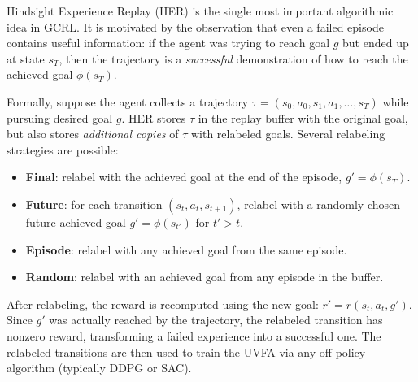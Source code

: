 \documentclass[11pt, letterpaper]{article}
\begin{document}
\begin{concept}
    Hindsight Experience Replay (HER) is the single most important algorithmic idea in GCRL. It is motivated by the observation that even a failed episode contains useful information: if the agent was trying to reach goal \(g\) but ended up at state \(s_T\), then the trajectory is a \textit{successful} demonstration of how to reach the achieved goal \(\phi(s_T)\).
 
    Formally, suppose the agent collects a trajectory \(\tau = (s_0, a_0, s_1, a_1, \dots, s_T)\) while pursuing desired goal \(g\). HER stores \(\tau\) in the replay buffer with the original goal, but also stores \textit{additional copies} of \(\tau\) with relabeled goals. Several relabeling strategies are possible:
    \begin{itemize}
        \item \textbf{Final}: relabel with the achieved goal at the end of the episode, \(g' = \phi(s_T)\).
        \item \textbf{Future}: for each transition \((s_t, a_t, s_{t+1})\), relabel with a randomly chosen future achieved goal \(g' = \phi(s_{t'})\) for \(t' > t\).
        \item \textbf{Episode}: relabel with any achieved goal from the same episode.
        \item \textbf{Random}: relabel with an achieved goal from any episode in the buffer.
    \end{itemize}
    After relabeling, the reward is recomputed using the new goal: \(r' = r(s_t, a_t, g')\). Since \(g'\) was actually reached by the trajectory, the relabeled transition has nonzero reward, transforming a failed experience into a successful one. The relabeled transitions are then used to train the UVFA via any off-policy algorithm (typically DDPG or SAC).
\end{concept}
 
\end{document}
